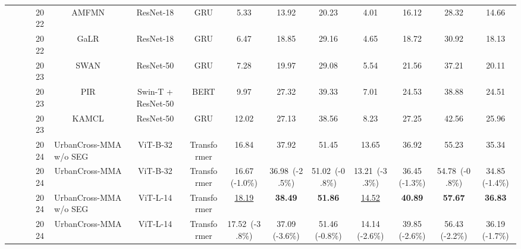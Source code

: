 \begin{table}
{\begin{tabular}{|c|c|c|c|c|c|c|ccc|ccc|c|}
 &  &  & 2022 & AMFMN & ResNet-18 & GRU & 5.33 & 13.92 & 20.23 & 4.01 & 16.12 & 28.32 & 14.66 \\
 &  &  & 2022 & GaLR & ResNet-18 & GRU & 6.47 & 18.85 & 29.16 & 4.65 & 18.72 & 30.92 & 18.13 \\
 &  &  & 2023 & SWAN & ResNet-50 & GRU & 7.28 & 19.97 & 29.08 & 5.54 & 21.56 & 37.21 & 20.11 \\
 &  &  & 2023 & PIR & Swin-T + ResNet-50 & BERT & 9.97 & 27.32 & 39.33 & 7.01 & 24.53 & 38.88 & 24.51 \\
 &  &  & 2023 & KAMCL & ResNet-50 & GRU & 12.02 & 27.13 & 38.56 & 8.23 & 27.25 & 42.56 & 25.96 \\ 
 &  &  & 2024 & \multicolumn{1}{l|}{{\cellcolor[rgb]{1,0.914,0.91}}UrbanCross-MMA w/o SEG} & {\cellcolor[rgb]{1,0.914,0.91}}ViT-B-32 & {\cellcolor[rgb]{1,0.914,0.91}}Transformer & {\cellcolor[rgb]{1,0.914,0.91}}16.84 & {\cellcolor[rgb]{1,0.914,0.91}}37.92 & {\cellcolor[rgb]{1,0.914,0.91}}51.45 & {\cellcolor[rgb]{1,0.914,0.91}}13.65 & {\cellcolor[rgb]{1,0.914,0.91}}36.92 & {\cellcolor[rgb]{1,0.914,0.91}}55.23 & {\cellcolor[rgb]{1,0.914,0.91}}35.34 \\
 &  &  & 2024 & {\cellcolor[rgb]{1,0.914,0.91}}UrbanCross-MMA & {\cellcolor[rgb]{1,0.914,0.91}}ViT-B-32 & {\cellcolor[rgb]{1,0.914,0.91}}Transformer & {\cellcolor[rgb]{1,0.914,0.91}}16.67 (-1.0\%) & {\cellcolor[rgb]{1,0.914,0.91}}36.98~(-2.5\%) & {\cellcolor[rgb]{1,0.914,0.91}}51.02~(-0.8\%) & {\cellcolor[rgb]{1,0.914,0.91}}13.21~(-3.3\%) & {\cellcolor[rgb]{1,0.914,0.91}}36.45 (-1.3\%) & {\cellcolor[rgb]{1,0.914,0.91}}54.78~(-0.8\%) & {\cellcolor[rgb]{1,0.914,0.91}}34.85 (-1.4\%) \\ 
 &  &  & 2024 & \multicolumn{1}{l|}{{\cellcolor[rgb]{1,0.914,0.91}}UrbanCross-MMA w/o SEG} & {\cellcolor[rgb]{1,0.914,0.91}}ViT-L-14 & {\cellcolor[rgb]{1,0.914,0.91}}Transformer & {\cellcolor[rgb]{1,0.914,0.91}}\uline{18.19} & {\cellcolor[rgb]{1,0.914,0.91}}\textbf{38.49 } & {\cellcolor[rgb]{1,0.914,0.91}}\textbf{51.86 } & {\cellcolor[rgb]{1,0.914,0.91}}\uline{14.52} & {\cellcolor[rgb]{1,0.914,0.91}}\textbf{40.89 } & {\cellcolor[rgb]{1,0.914,0.91}}\textbf{57.67 } & {\cellcolor[rgb]{1,0.914,0.91}}\textbf{36.83 } \\
 &  &  & 2024 & {\cellcolor[rgb]{1,0.914,0.91}}UrbanCross-MMA & {\cellcolor[rgb]{1,0.914,0.91}}ViT-L-14 & {\cellcolor[rgb]{1,0.914,0.91}}Transformer & {\cellcolor[rgb]{1,0.914,0.91}}17.52~(-3.8\%) & {\cellcolor[rgb]{1,0.914,0.91}}37.09 (-3.6\%) & {\cellcolor[rgb]{1,0.914,0.91}}51.46 (-0.8\%) & {\cellcolor[rgb]{1,0.914,0.91}}14.14 (-2.6\%) & {\cellcolor[rgb]{1,0.914,0.91}}39.85 (-2.6\%) & {\cellcolor[rgb]{1,0.914,0.91}}56.43 (-2.2\%) & {\cellcolor[rgb]{1,0.914,0.91}}36.19 (-1.7\%) \\ 

\end{tabular}}
\end{table}

